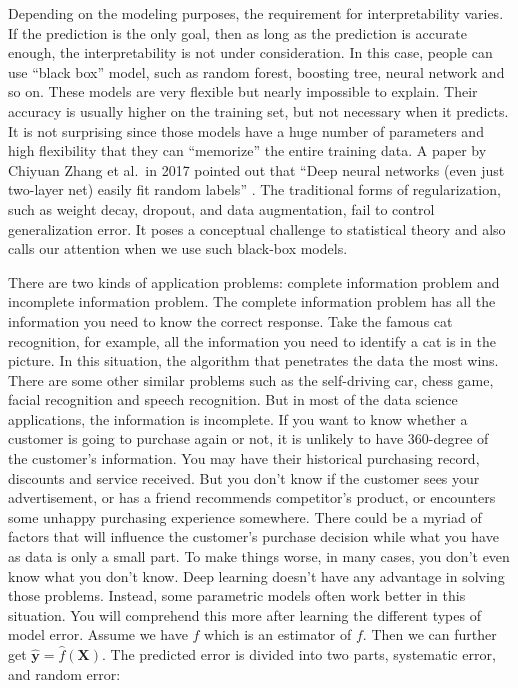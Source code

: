 \documentclass[12pt,]{krantz}
\begin{document}
Depending on the modeling purposes, the requirement for interpretability varies. If the prediction is the only goal, then as long as the prediction is accurate enough, the interpretability is not under consideration. In this case, people can use ``black box'' model, such as random forest, boosting tree, neural network and so on. These models are very flexible but nearly impossible to explain. Their accuracy is usually higher on the training set, but not necessary when it predicts. It is not surprising since those models have a huge number of parameters and high flexibility that they can ``memorize'' the entire training data. A paper by Chiyuan Zhang et al.~in 2017 pointed out that ``Deep neural networks (even just two-layer net) easily fit random labels'' \citep{rethinkDL}. The traditional forms of regularization, such as weight decay, dropout, and data augmentation, fail to control generalization error. It poses a conceptual challenge to statistical theory and also calls our attention when we use such black-box models.

There are two kinds of application problems: complete information problem and incomplete information problem. The complete information problem has all the information you need to know the correct response. Take the famous cat recognition, for example, all the information you need to identify a cat is in the picture. In this situation, the algorithm that penetrates the data the most wins. There are some other similar problems such as the self-driving car, chess game, facial recognition and speech recognition. But in most of the data science applications, the information is incomplete. If you want to know whether a customer is going to purchase again or not, it is unlikely to have 360-degree of the customer's information. You may have their historical purchasing record, discounts and service received. But you don't know if the customer sees your advertisement, or has a friend recommends competitor's product, or encounters some unhappy purchasing experience somewhere. There could be a myriad of factors that will influence the customer's purchase decision while what you have as data is only a small part. To make things worse, in many cases, you don't even know what you don't know. Deep learning doesn't have any advantage in solving those problems. Instead, some parametric models often work better in this situation. You will comprehend this more after learning the different types of model error.
Assume we have \(\hat{f}\) which is an estimator of \(f\). Then we can further get \(\symbf{\hat{y}}=\hat{f}(\mathbf{X})\). The predicted error is divided into two parts, systematic error, and random error:
\end{document}
